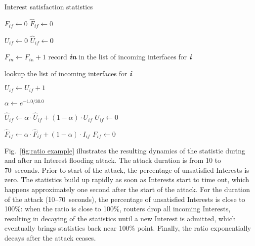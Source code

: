 \begin{algorithm}[h]
\footnotesize
\caption{\small Interest satisfaction statistics}
\label{algo:interest stats}
\begin{algorithmic}[1]

    \State $F_{if} \leftarrow 0$ 
    \State $\hat F_{if} \leftarrow 0$ 

    \State $U_{if} \leftarrow 0$ 
    \State $\hat U_{if} \leftarrow 0$ 
\EndFor

\vspace{0.1cm}
  \State $F_{in} \leftarrow F_{in} + 1$
  \State record \textbf{\emph{in}} in the list of incoming interfaces for \textbf{\emph{i}}
\EndFunction

\vspace{0.1cm}
    \State lookup the list of incoming interfaces for \textbf{\emph{i}}

        \State $U_{if} \leftarrow U_{if} + 1$
    \EndFor
\EndFunction

\vspace{0.1cm}

\State {} 
 
\State $\alpha \leftarrow e^{-1.0/30.0}$  %

    \State $\hat U_{if} \leftarrow \alpha \cdot \hat U_{if} + (1 - \alpha) \cdot U_{if}$ 
    \State $U_{if} \leftarrow 0$ 

     
        \State $\hat F_{if} \leftarrow \alpha \cdot \hat F_{if} + (1 - \alpha) \cdot I_{if}$ 
        \State $F_{if} \leftarrow 0$ 
    \EndIf
\EndFor

\EndFunction

\end{algorithmic}
\end{algorithm}


Fig.~\ref{fig:ratio example} illustrates the resulting dynamics of the statistic during and after an Interest flooding attack. The attack duration is from 10 to 70~seconds. Prior to start of the attack, the percentage of unsatisfied Interests is zero.  
The statistics build up rapidly as soon as Interests start to time out, which happens approximately one second after the start of the attack.%
For the duration of the attack (10--70~seconds), the percentage of unsatisfied Interests is close to 100\%: 
when the ratio is close to 100\%, routers drop all incoming Interests, resulting in decaying of the statistics until a new Interest is admitted, which eventually brings statistics back near 100\% point.
Finally, the ratio exponentially decays after the attack ceases.

